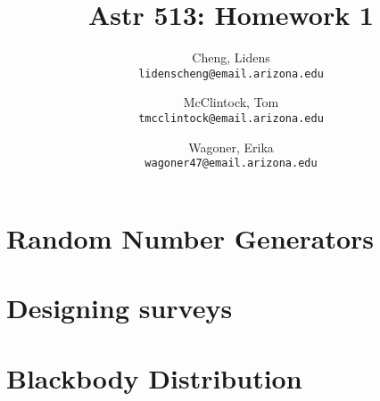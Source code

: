 \documentclass[12pt,a4paper]{article}
\author{
  Cheng, Lidens\\
  \texttt{lidenscheng@email.arizona.edu}
  \and
  McClintock, Tom\\
  \texttt{tmcclintock@email.arizona.edu}
  \and
  Wagoner, Erika\\
  \texttt{wagoner47@email.arizona.edu}
}
\title{Astr 513: Homework 1}
\begin{document}
\maketitle
  
\section{Random Number Generators}

\section{Designing surveys}

\section{Blackbody Distribution}
\end{document}
